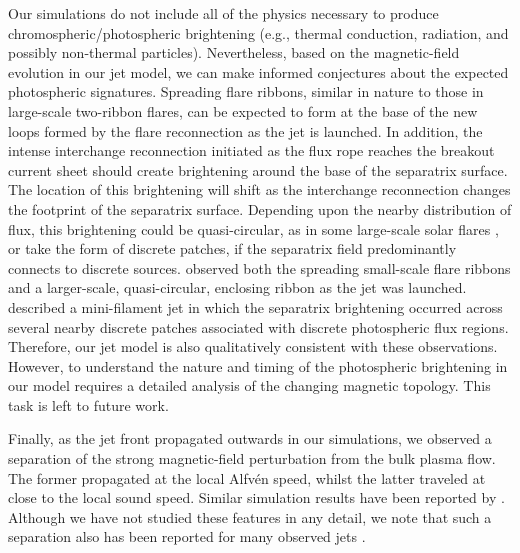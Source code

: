 \documentclass[twocolumn]{aastex6}
\begin{document}
Our simulations do not include all of the physics necessary to produce chromospheric/photospheric brightening (e.g., thermal conduction, radiation, and possibly non-thermal particles). Nevertheless, based on the magnetic-field evolution in our jet model, we can make informed conjectures about the expected photospheric signatures. Spreading flare ribbons, similar in nature to those in large-scale two-ribbon flares, can be expected to form at the base of the new loops formed by the flare reconnection as the jet is launched. In addition, the intense interchange reconnection initiated as the flux rope reaches the breakout current sheet should create brightening around the base of the separatrix surface. The location of this brightening will shift as the interchange reconnection changes the footprint of the separatrix surface. Depending upon the nearby distribution of flux, this brightening could be quasi-circular, as in some large-scale solar flares \citep[e.g.][]{Masson2012}, or take the form of discrete patches, if the separatrix field predominantly connects to discrete sources. \citet{Zhang2016b} observed both the spreading small-scale flare ribbons and a larger-scale, quasi-circular, enclosing ribbon as the jet was launched. \citet{Hong2016} described a mini-filament jet in which the separatrix brightening occurred across several nearby discrete patches associated with discrete photospheric flux regions. Therefore, our jet model is also qualitatively consistent with these observations. However, to understand the nature and timing of the photospheric brightening in our model requires a detailed analysis of the changing magnetic topology. This task is left to future work. 

Finally, as the jet front propagated outwards in our simulations, we observed a separation of the strong magnetic-field perturbation from the bulk plasma flow. The former propagated at the local Alfv\'{e}n speed, whilst the latter traveled at close to the local sound speed. Similar simulation results have been reported by \citet{Pariat2016}. Although we have not studied these features in any detail, we note that such a separation also has been reported for many observed jets \citep{Cirtain2007,Savcheva2007}. 
\end{document}
